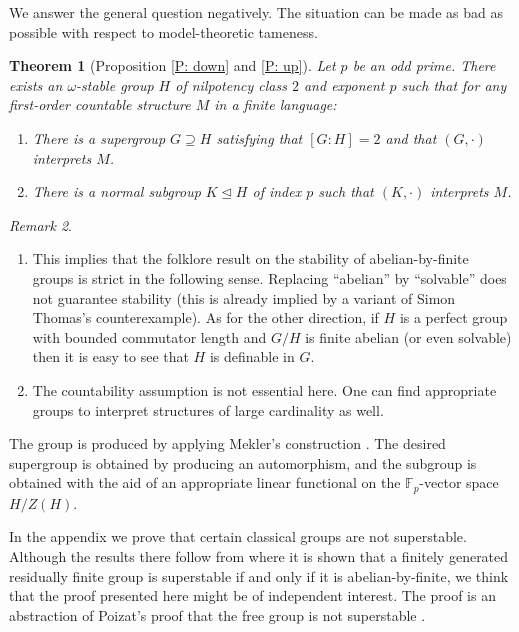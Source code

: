 \documentclass[11pt]{amsart}
\theoremstyle{plain}
\newtheorem{theorem}{Theorem}[section]
\theoremstyle{definition}
\theoremstyle{remark}
\newtheorem{remark}[theorem]{Remark}
\numberwithin{equation}{section}
\begin{document}

We answer the general question negatively. The situation can be made as bad as possible with respect to model-theoretic tameness.

\begin{theorem}[Proposition \ref{P: down} and \ref{P: up}]\label{T:main}
    Let $p$ be an odd prime. There exists an $\omega$-stable group $H$ of nilpotency class $2$ and exponent $p$ such that for any first-order countable structure $M$ in a finite  language:
    \begin{enumerate}
        \item   There is a supergroup $G\supseteq H$ satisfying that $[G:H]=2$ and that $(G,\cdot)$ interprets $M$.

        \item There is a normal subgroup $K\trianglelefteq H$ of index $p$ such that $(K,\cdot)$ interprets $M$.
    \end{enumerate}
\end{theorem}
\begin{remark}
\begin{enumerate}
    \item This implies that the folklore result on the stability of abelian-by-finite groups is strict in the following sense. Replacing ``abelian'' by ``solvable'' does not guarantee stability (this is already implied by a variant of Simon Thomas's counterexample). As for the other direction, if $H$ is a perfect group with bounded commutator length and $G/H$ is finite abelian (or even solvable) then it is easy to see that $H$ is definable in $G$. 
    
    \item The countability assumption is not essential here. One can find appropriate groups to interpret structures of large cardinality as well.
\end{enumerate}
\end{remark}

    

The group is produced by applying Mekler's construction \cite{Mek:stability}.  The desired supergroup is obtained by producing an automorphism, and the subgroup is obtained with the aid of an appropriate linear functional on the $\mathbb{F}_p$-vector space $H/Z(H)$.

In the appendix we prove that certain classical groups are not superstable. Although the results there follow from \cite[Corollary 1.3]{superstablereisdual} where it is shown that a finitely generated residually finite group is superstable if and only if it is abelian-by-finite, we think that the proof presented here might be of independent interest. The proof is an abstraction of Poizat's proof that the free group is not superstable \cite{Poi:FreeNSuperstable}.
\end{document}
